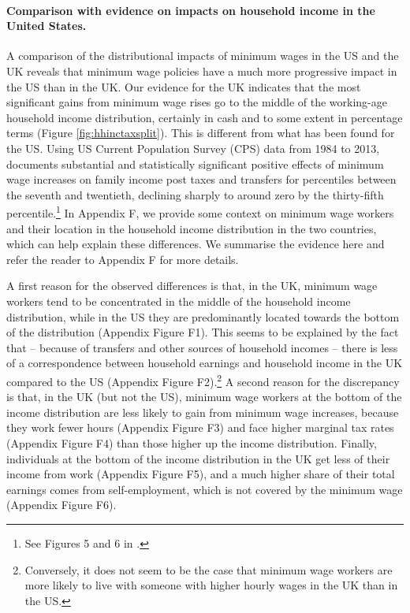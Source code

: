 \paragraph{Comparison with evidence on impacts on household income in the United States.} A comparison of the distributional impacts of minimum wages in the US and the UK reveals that minimum wage policies have a much more progressive impact in the US than in the UK. Our evidence for the UK indicates that the most significant gains from minimum wage rises go to the middle of the working-age household income distribution, certainly in cash and to some extent in percentage terms (Figure \ref{fig:hhinctaxsplit}). This is  different from what has been found for the US. Using US Current Population Survey (CPS) data from 1984 to 2013, \citet{Dube2019} documents substantial and statistically significant positive effects of minimum wage increases on family income post taxes and transfers for percentiles between the seventh and twentieth, declining sharply to around zero by the thirty-fifth percentile.\footnote{See Figures 5 and 6 in \citet{Dube2019}.} In Appendix F, we provide some context on minimum wage workers and their location in the household income distribution in the two countries, which can help explain these differences. We summarise the evidence here and refer the reader to Appendix F for more details. 

A first reason for the observed differences is that, in the UK, minimum wage workers tend to be concentrated in the middle of the household income distribution, while in the US they are predominantly located towards the bottom of the distribution (Appendix Figure F1). This seems to be explained by the fact that -- because of transfers and other sources of household incomes -- there is less of a correspondence between household earnings and household income in the UK compared to the US (Appendix Figure F2).\footnote{Conversely, it does not seem to be the case that minimum wage workers are more likely to live with someone with higher hourly wages in the UK than in the US.} A second reason for the discrepancy is that, in the UK (but not the US), minimum wage workers at the bottom of the income distribution are less likely to gain from minimum wage increases, because they work fewer hours (Appendix Figure F3) and face higher marginal tax rates (Appendix Figure F4) than those higher up the income distribution. Finally, individuals at the bottom of the income distribution in the UK get less of their income from work (Appendix Figure F5), and a much higher share of their total earnings comes from self-employment, which is not covered by the minimum wage (Appendix Figure F6).


